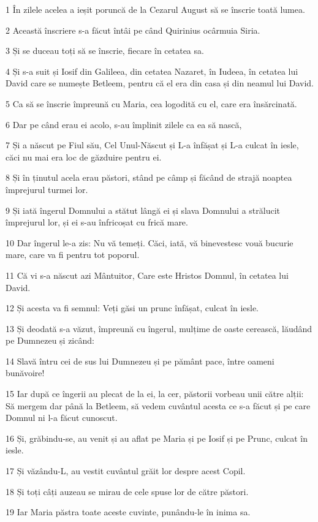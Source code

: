 \par 1 În zilele acelea a ieșit poruncă de la Cezarul August să se înscrie toată lumea.
\par 2 Această înscriere s-a făcut întâi pe când Quirinius ocârmuia Siria.
\par 3 Și se duceau toți să se înscrie, fiecare în cetatea sa.
\par 4 Și s-a suit și Iosif din Galileea, din cetatea Nazaret, în Iudeea, în cetatea lui David care se numește Betleem, pentru că el era din casa și din neamul lui David.
\par 5 Ca să se înscrie împreună cu Maria, cea logodită cu el, care era însărcinată.
\par 6 Dar pe când erau ei acolo, s-au împlinit zilele ca ea să nască,
\par 7 Și a născut pe Fiul său, Cel Unul-Născut și L-a înfășat și L-a culcat în iesle, căci nu mai era loc de găzduire pentru ei.
\par 8 Și în ținutul acela erau păstori, stând pe câmp și făcând de strajă noaptea împrejurul turmei lor.
\par 9 Și iată îngerul Domnului a stătut lângă ei și slava Domnului a strălucit împrejurul lor, și ei s-au înfricoșat cu frică mare.
\par 10 Dar îngerul le-a zis: Nu vă temeți. Căci, iată, vă binevestesc vouă bucurie mare, care va fi pentru tot poporul.
\par 11 Că vi s-a născut azi Mântuitor, Care este Hristos Domnul, în cetatea lui David.
\par 12 Și acesta va fi semnul: Veți găsi un prunc înfășat, culcat în iesle.
\par 13 Și deodată s-a văzut, împreună cu îngerul, mulțime de oaste cerească, lăudând pe Dumnezeu și zicând:
\par 14 Slavă întru cei de sus lui Dumnezeu și pe pământ pace, între oameni bunăvoire!
\par 15 Iar după ce îngerii au plecat de la ei, la cer, păstorii vorbeau unii către alții: Să mergem dar până la Betleem, să vedem cuvântul acesta ce s-a făcut și pe care Domnul ni l-a făcut cunoscut.
\par 16 Și, grăbindu-se, au venit și au aflat pe Maria și pe Iosif și pe Prunc, culcat în iesle.
\par 17 Și văzându-L, au vestit cuvântul grăit lor despre acest Copil.
\par 18 Și toți câți auzeau se mirau de cele spuse lor de către păstori.
\par 19 Iar Maria păstra toate aceste cuvinte, punându-le în inima sa.
